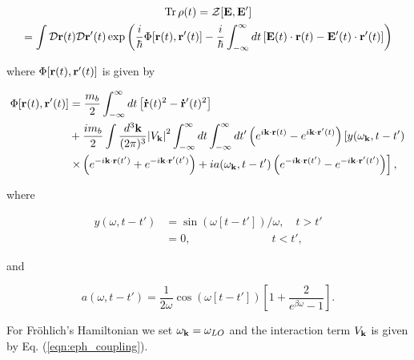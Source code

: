 \begin{equation}
    \begin{gathered}
    \Tr \rho(t) = \mathcal{Z}[\vb{E}, \vb{E'}] \\ = \int \mathcal{D}\vb{r}(t) \mathcal{D}\vb{r'}(t) \exp\left( \frac{i}{\hbar} \Phi[\vb{r}(t), \vb{r'}(t)] - \frac{i}{\hbar} \int^{\infty}_{-\infty} dt \left[ \vb{E}(t) \cdot \vb{r}(t) - \vb{E'}(t) \cdot \vb{r'}(t) \right] \right)
    \end{gathered}
\end{equation}

where $ \Phi[\vb{r}(t), \vb{r'}(t)]$ is given by

\begin{equation}\label{eqn:fhip_model_term}
    \begin{aligned}
    \Phi[\vb{r}(t), \vb{r'}(t)] &= \frac{m_b}{2} \int^{\infty}_{-\infty} dt  \left[ \vb{\dot{r}}(t)^2 - \vb{\dot{r}'}(t)^2 \right] \\
    &+ \frac{im_b}{2} \int \frac{d^3\vb{k}}{(2\pi)^3} \abs{V_{\vb{k}}}^2 \int^{\infty}_{-\infty} dt \int^{\infty}_{-\infty} dt'  \left(e^{i\vb{k}\cdot \vb{r}(t)} -  e^{i\vb{k}\cdot \vb{r'}(t)}\right)\left[ y(\omega_{\vb{k}}, t - t') \right. \\
    &\left. \times \left( e^{-i\vb{k}\cdot \vb{r}(t')} + e^{-i\vb{k}\cdot \vb{r'}(t')}\right) + ia(\omega_{\vb{k}}, t - t') \left( e^{-i\vb{k}\cdot \vb{r}(t')} - e^{-i\vb{k}\cdot \vb{r'}(t')}\right) \right],
    \end{aligned}
\end{equation}

where

\begin{equation}
    \begin{aligned}
        y(\omega, t - t') &= \sin(\omega [t - t']) / \omega, \quad t > t' \\
        &= 0, \qquad\qquad\qquad\quad\ t < t',
    \end{aligned}
\end{equation}

and 

\begin{equation}
    a(\omega, t - t') = \frac{1}{2\omega} \cos(\omega[t-t']) \left[1 + \frac{2}{e^{\beta \omega} - 1}\right].
\end{equation}

For Fr\"ohlich's Hamiltonian we set $\omega_{\vb{k}} = \omega_{LO}$ and the interaction term $V_{\vb{k}}$ is given by Eq. (\ref{eqn:eph_coupling}). 

